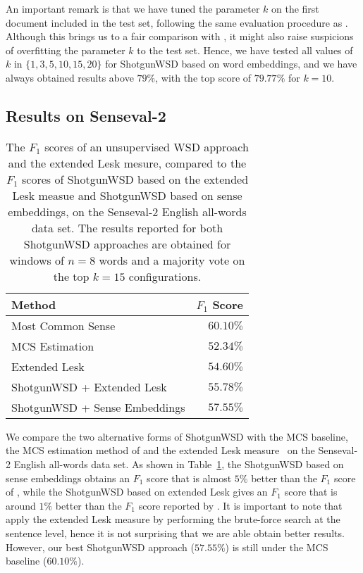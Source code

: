 \documentclass[11pt]{article}
\begin{document}
An important remark is that we have tuned the parameter $k$ on the first document included in the test set, following the same evaluation procedure as . Although this brings us to a fair comparison with , it might also raise suspicions of overfitting the parameter $k$ to the test set. Hence, we have tested all values of $k$ in $\{1,3,5,10,15,20 \}$ for ShotgunWSD based on word embeddings, and we have always obtained results above $79\%$, with the top score of $79.77\%$ for $k=10$. 

\subsection{Results on Senseval-2}

\begin{table}[h]
\small{
\begin{center}
\begin{tabular}{|l|r|}
\hline
Method 																										& $F_1$ Score\\
\hline
Most Common Sense																					& $60.10\%$\\
MCS Estimation~\cite{Bhingardive-NAACL-2015} 										& $52.34\%$\\
Extended Lesk~\cite{Torres-Lesk-2009}														& $54.60\%$\\
\hline
ShotgunWSD + Extended Lesk																		& $55.78\%$\\
ShotgunWSD + Sense Embeddings																& $57.55\%$\\
\hline
\end{tabular}
\end{center}
\caption{\label{tab_Senseval2_Results} The $F_1$ scores of an unsupervised WSD approach and the extended Lesk mesure, compared to the $F_1$ scores of ShotgunWSD based on the extended Lesk measue and ShotgunWSD based on sense embeddings, on the Senseval-2 English all-words data set. The results reported for both ShotgunWSD approaches are obtained for windows of $n=8$ words and a majority vote on the top $k=15$ configurations.}
}
\end{table}

We compare the two alternative forms of ShotgunWSD with the MCS baseline, the MCS estimation method of  and the extended Lesk measure~\cite{Torres-Lesk-2009} on the Senseval-2 English all-words data set. As shown in Table~\ref{tab_Senseval2_Results}, the ShotgunWSD based on sense embeddings obtains an $F_1$ score that is almost $5\%$ better than the $F_1$ score of , while the ShotgunWSD based on extended Lesk gives an $F_1$ score that is around $1\%$ better than the $F_1$ score reported by . It is important to note that  apply the extended Lesk measure by performing the brute-force search at the sentence level, hence it is not surprising that we are able obtain better results. However, our best ShotgunWSD approach ($57.55\%$) is still under the MCS baseline ($60.10\%$).
\end{document}

